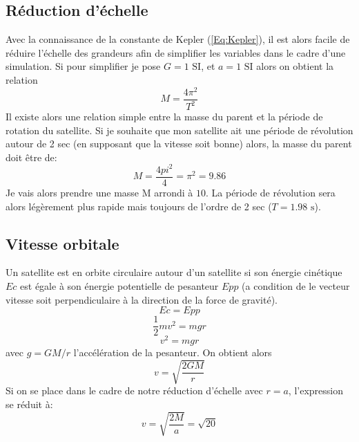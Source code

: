 \subsection*{Réduction d'échelle}
Avec la connaissance de la constante de Kepler (\ref{Eq:Kepler}), il est alors facile de réduire l'échelle des grandeurs afin de simplifier les variables dans le cadre d'une simulation. Si pour simplifier je pose $G = 1 \text{ SI}$, et $a = 1 \text{ SI}$ alors on obtient la relation
\begin{equation}
\boxed{
    M = \dfrac{4 \pi^2}{T^2} 
    }
\end{equation}
Il existe alors une relation simple entre la masse du parent et la période de rotation du satellite. Si je souhaite que mon satellite ait une période de révolution autour de 2 sec (en supposant que la vitesse soit bonne) alors, la masse du parent doit être de:
$$
M = \dfrac{4 pi^2}{4} = \pi^2 = 9.86
$$
Je vais alors prendre une masse M arrondi à $10$. La période de révolution sera alors légèrement plus rapide mais toujours de l'ordre de 2 sec ($T = 1.98 \text{ s}$).
\subsection*{Vitesse orbitale}
Un satellite est en orbite circulaire autour d'un satellite si son énergie cinétique $Ec$ est égale à son énergie potentielle de pesanteur $Epp$ (a condition de le vecteur vitesse soit perpendiculaire à la direction de la force de gravité).
\begin{equation}
    Ec = Epp
\end{equation}
$$
\dfrac{1}{2} m v^2 = m g r
$$$$
v^2 = m g r
$$
avec $g = GM/r$ l'accélération de la pesanteur. On obtient alors
\begin{equation}
\boxed{
    v = \sqrt{\dfrac{2 G M}{r}}
    }
\end{equation}
Si on se place dans le cadre de notre réduction d'échelle avec $r=a$, l'expression se réduit à:
\begin{equation}
    v = \sqrt{\dfrac{2 M}{a}} = \sqrt{20}
\end{equation}
